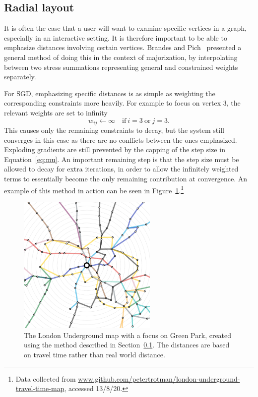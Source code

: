 \subsection{Radial layout}
\label{sec:sgd_radial}

It is often the case that a user will want to examine specific vertices in a graph, especially in an interactive setting. It is therefore important to be able to emphasize distances involving certain vertices.
Brandes and Pich~\cite{Brandes2011} presented a general method of doing this in the context of majorization, by interpolating between two stress summations representing general and constrained weights separately.

For SGD, emphasizing specific distances is as simple as weighting the corresponding constraints more heavily.
For example to focus on vertex 3, the relevant weights are set to infinity
\begin{equation}
  w_{ij} \leftarrow \infty \quad \text{if}\ i=3\ \text{or}\ j=3.
\end{equation}
This causes only the remaining constraints to decay, but the system still converges in this case as there are no conflicts between the ones emphasized. Exploding gradients are still prevented by the capping of the step size in Equation~\eqref{eq:mu}.
An important remaining step is that the step size must be allowed to decay for extra iterations, in order to allow the infinitely weighted terms to essentially become the only remaining contribution at convergence. 
An example of this method in action can be seen in Figure~\ref{fig:tube}.\footnote{Data collected from
\url{www.github.com/petertrotman/london-underground-travel-time-map}, accessed 13/8/20.}

\begin{figure}
  \centering
  \includegraphics[width=0.6\textwidth]{stress/tube.png}
  \caption[The London tube map with a focus on Green Park station]{The London Underground map with a focus on Green Park, created using the method described in Section~\ref{sec:sgd_radial}. The distances are based on travel time rather than real world distance.}
  \label{fig:tube}
\end{figure}

